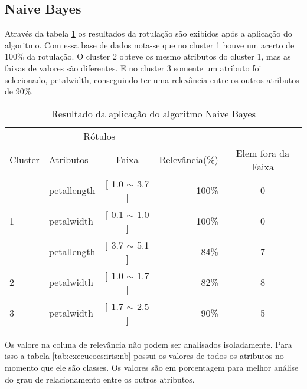 \subsection{Naive Bayes} \label{cap:resultados:ssec:iris:nb}

Através da tabela \ref{tab:rot:iris:nb} os resultados da rotulação são exibidos após a aplicação do algoritmo. Com essa base de dados nota-se que no cluster 1 houve um acerto de 100\% da rotulação. O cluster 2 obteve os mesmo atributos do cluster 1, mas as faixas de valores são diferentes. E no cluster 3 somente um atributo foi selecionado, petalwidth, conseguindo ter uma relevância entre os outros atributos de 90\%.

\begin{table}[!h]
\centering
\caption{Resultado da aplicação do algoritmo Naive Bayes}
\label{tab:rot:iris:nb}
\begin{tabular}{llcrc} \hline
 
\multicolumn{1}{c}{\cellcolor[HTML]{FFFFFF}} & \multicolumn{2}{c}{Rótulos}                & \multicolumn{1}{r}{}               & \\ \cline{2-3}
Cluster                                      & Atributos      & \multicolumn{1}{c}{Faixa} & \multicolumn{1}{c}{Relevância(\%)} & Elem fora da Faixa\\ \hline \hline
                                             & petallength    & [ 1.0 $\sim$  3.7 ]       & 100\%                               & 0 \\  
\multirow{-2}{*}{1}                          & petalwidth     & [ 0.1 $\sim$  1.0 ]       & 100\%                               & 0 \\  \hline
                                             & petallength    & ] 3.7 $\sim$  5.1 ]       & 84\%                               & 7\\ 
\multirow{-2}{*}{2}                          & petalwidth     & ] 1.0 $\sim$  1.7 ]       & 82\%                               & 8\\  \hline
3                                            & petalwidth     & ] 1.7 $\sim$  2.5 ]       & 90\%                               & 5\\ \hline \hline
\end{tabular}
\end{table}

Os valore na coluna de relevância não podem ser analisados isoladamente. Para isso  a tabela \ref{tab:execucoes:iris:nb} possui os valores de todos os atributos no momento que ele são classes. Os valores são em porcentagem para melhor análise do grau de relacionamento entre os outros atributos.

